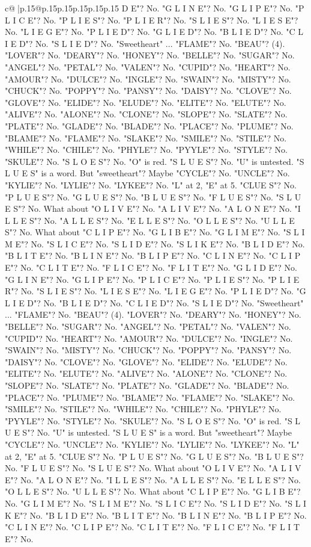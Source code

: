 \documentclass{article}
\begin{document}
{\begin{supertabular}{c@{$\;$}|p{.15\linewidth}@{}p{.15\linewidth}p{.15\linewidth}p{.15\linewidth}p{.15\linewidth}p{.15\linewidth}}
{{{D E"? No. "G L I N E"? No. "G L I P E"? No. "P L I C E"? No. "P L I E S"? No. "P L I E R"? No. "S L I E S"? No. "L I E S E"? No. "L I E G E"? No. "P L I E D"? No. "G L I E D"? No. "B L I E D"? No. "C L I E D"? No. "S L I E D"? No. "Sweetheart" ... "FLAME"? No. "BEAU"? (4). "LOVER"? No. "DEARY"? No. "HONEY"? No. "BELLE"? No. "SUGAR"? No. "ANGEL"? No. "PETAL"? No. "VALEN"? No. "CUPID"? No. "HEART"? No. "AMOUR"? No. "DULCE"? No. "INGLE"? No. "SWAIN"? No. "MISTY"? No. "CHUCK"? No. "POPPY"? No. "PANSY"? No. "DAISY"? No. "CLOVE"? No. "GLOVE"? No. "ELIDE"? No. "ELUDE"? No. "ELITE"? No. "ELUTE"? No. "ALIVE"? No. "ALONE"? No. "CLONE"? No. "SLOPE"? No. "SLATE"? No. "PLATE"? No. "GLADE"? No. "BLADE"? No. "PLACE"? No. "PLUME"? No. "BLAME"? No. "FLAME"? No. "SLAKE"? No. "SMILE"? No. "STILE"? No. "WHILE"? No. "CHILE"? No. "PHYLE"? No. "PYYLE"? No. "STYLE"? No. "SKULE"? No. "S L O E S"? No. "O" is red. "S L U E S"? No. "U" is untested. "S L U E S" is a word. But "sweetheart"? Maybe "CYCLE"? No. "UNCLE"? No. "KYLIE"? No. "LYLIE"? No. "LYKEE"? No. "L" at 2, "E" at 5. "CLUE S"? No. "P L U E S"? No. "G L U E S"? No. "B L U E S"? No. "F L U E S"? No. "S L U E S"? No. What about "O L I V E"? No. "A L I V E"? No. "A L O N E"? No. "I L L E S"? No. "A L L E S"? No. "E L L E S"? No. "O L L E S"? No. "U L L E S"? No. What about "C L I P E"? No. "G L I B E"? No. "G L I M E"? No. "S L I M E"? No. "S L I C E"? No. "S L I D E"? No. "S L I K E"? No. "B L I D E"? No. "B L I T E"? No. "B L I N E"? No. "B L I P E"? No. "C L I N E"? No. "C L I P E"? No. "C L I T E"? No. "F L I C E"? No. "F L I T E"? No. "G L I D E"? No. "G L I N E"? No. "G L I P E"? No. "P L I C E"? No. "P L I E S"? No. "P L I E R"? No. "S L I E S"? No. "L I E S E"? No. "L I E G E"? No. "P L I E D"? No. "G L I E D"? No. "B L I E D"? No. "C L I E D"? No. "S L I E D"? No. "Sweetheart" ... "FLAME"? No. "BEAU"? (4). "LOVER"? No. "DEARY"? No. "HONEY"? No. "BELLE"? No. "SUGAR"? No. "ANGEL"? No. "PETAL"? No. "VALEN"? No. "CUPID"? No. "HEART"? No. "AMOUR"? No. "DULCE"? No. "INGLE"? No. "SWAIN"? No. "MISTY"? No. "CHUCK"? No. "POPPY"? No. "PANSY"? No. "DAISY"? No. "CLOVE"? No. "GLOVE"? No. "ELIDE"? No. "ELUDE"? No. "ELITE"? No. "ELUTE"? No. "ALIVE"? No. "ALONE"? No. "CLONE"? No. "SLOPE"? No. "SLATE"? No. "PLATE"? No. "GLADE"? No. "BLADE"? No. "PLACE"? No. "PLUME"? No. "BLAME"? No. "FLAME"? No. "SLAKE"? No. "SMILE"? No. "STILE"? No. "WHILE"? No. "CHILE"? No. "PHYLE"? No. "PYYLE"? No. "STYLE"? No. "SKULE"? No. "S L O E S"? No. "O" is red. "S L U E S"? No. "U" is untested. "S L U E S" is a word. But "sweetheart"? Maybe "CYCLE"? No. "UNCLE"? No. "KYLIE"? No. "LYLIE"? No. "LYKEE"? No. "L" at 2, "E" at 5. "CLUE S"? No. "P L U E S"? No. "G L U E S"? No. "B L U E S"? No. "F L U E S"? No. "S L U E S"? No. What about "O L I V E"? No. "A L I V E"? No. "A L O N E"? No. "I L L E S"? No. "A L L E S"? No. "E L L E S"? No. "O L L E S"? No. "U L L E S"? No. What about "C L I P E"? No. "G L I B E"? No. "G L I M E"? No. "S L I M E"? No. "S L I C E"? No. "S L I D E"? No. "S L I K E"? No. "B L I D E"? No. "B L I T E"? No. "B L I N E"? No. "B L I P E"? No. "C L I N E"? No. "C L I P E"? No. "C L I T E"? No. "F L I C E"? No. "F L I T E"? No. }}}
\end{supertabular}}
\end{document}
